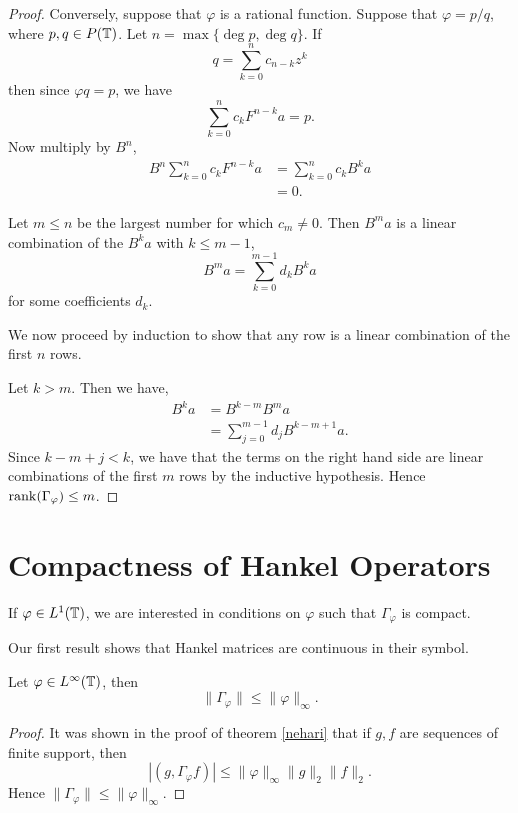 \begin{proof}
    Conversely, suppose that $\varphi$ is a rational function. Suppose
    that $\varphi = p/q$, where $p,q \in P(\mathbb{T})$. 
    Let $n = \max\{\deg p,\deg q\}$.
    If 
    \begin{equation}
        q = \sum_{k=0}^n c_{n-k}z^k
    \end{equation}
    then since $\varphi q = p$, we have
    \begin{equation}
        \sum_{k=0}^n c_k F^{n-k} a = p.
    \end{equation}
    Now multiply by $B^n$,
    \begin{align}
        B^n\sum_{k=0}^n  c_k F^{n-k} a &= \sum_{k=0}^n c_k B^k a\\
        &= 0.
    \end{align}
    
    Let $m \leq n$ be the largest number for which $c_m \neq 0$. Then $B^m a$
    is a linear combination of the $B^k a$ with $k \leq m-1$,
    \begin{equation}
        B^m a = \sum_{k=0}^{m-1} d_k B^k a
    \end{equation}
    for some coefficients $d_k$. 
    
    We now proceed by induction to show that any row is a linear combination
    of the first $n$ rows. 
    
    Let $k > m$. Then we have,
    \begin{align}
        B^k a &= B^{k-m} B^m a\\
        &= \sum_{j=0}^{m-1} d_j B^{k-m+1}a.
    \end{align}
    Since $k-m+j < k$, we have that the terms on the right hand side are
    linear combinations of the first $m$ rows by the inductive hypothesis.
    Hence $\operatorname{rank}(\Gamma_\varphi) \leq m$. 
\end{proof}

\section{Compactness of Hankel Operators}
If $\varphi \in L^1(\mathbb{T})$, we are interested in conditions
on $\varphi$ such that $\Gamma_\varphi$ is compact. 

Our first result shows that Hankel matrices are continuous in their symbol.
\begin{proposition}
    Let $\varphi \in L^\infty(\mathbb{T})$, then
    \begin{equation}
        \|\Gamma_\varphi\| \leq \|\varphi\|_\infty.
    \end{equation}
\end{proposition}
\begin{proof}
    It was shown in the proof of theorem \ref{nehari} that if $g,f$ are sequences
    of finite support, then
    \begin{equation}
        |(g,\Gamma_\varphi f)| \leq \|\varphi\|_\infty \|g\|_2\|f\|_2.
    \end{equation}
    Hence $\|\Gamma_\varphi\| \leq \|\varphi\|_\infty$.
\end{proof}

